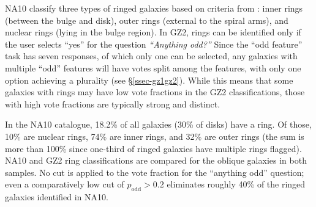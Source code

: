 \documentclass[useAMS,usenatbib]{mn2e}
\begin{document}
NA10 classify three types of ringed galaxies based on criteria from \citet{but96}: inner rings (between the bulge and disk), outer rings (external to the spiral arms), and nuclear rings (lying in the bulge region). In GZ2, rings can be identified only if the user selects ``yes'' for the question {\it ``Anything odd?''} Since the ``odd feature'' task has seven responses, of which only one can be selected, any galaxies with multiple ``odd'' features will have votes split among the features, with only one option achieving a plurality (see \S\ref{ssec-gz1gz2}). While this means that some galaxies with rings may have low vote fractions in the GZ2 classifications, those with high vote fractions are typically strong and distinct.

In the NA10 catalogue, 18.2\% of all galaxies (30\% of disks) have a ring. Of those, 10\% are nuclear rings, 74\% are inner rings, and 32\% are outer rings (the sum is more than 100\% since one-third of ringed galaxies have multiple rings flagged). NA10 and GZ2 ring classifications are compared for the oblique galaxies in both samples. No cut is applied to the vote fraction for the ``anything odd'' question; even a comparatively low cut of $p_\mathrm{odd}>0.2$ eliminates roughly 40\% of the ringed galaxies identified in NA10. %
\end{document}
